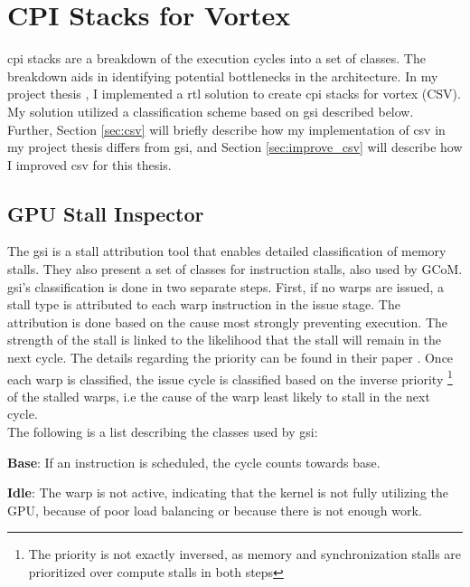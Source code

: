 \chapter{CPI Stacks for Vortex}

\Acrfull{cpi} stacks are a breakdown of the execution cycles into a set of classes. The breakdown aids in identifying potential bottlenecks in the architecture. In my project thesis \cite{Aurud_Project}, I implemented a \acrfull{rtl} solution to create \acrshort{cpi} stacks for \Gls{vortex} (CSV). My solution utilized a classification scheme based on \acrshort{gsi} \cite{GSI_GPU_Stall_Inspector} described below. Further, Section \ref{sec:csv} will briefly describe how my implementation of \acrshort{csv} in my project thesis differs from \acrshort{gsi}, and Section \ref{sec:improve_csv} will describe how I improved \acrshort{csv} for this thesis.

\section{GPU Stall Inspector} \label{sec:gsi}

The \acrfull{gsi}\cite{GSI_GPU_Stall_Inspector} is a stall attribution tool that enables detailed classification of memory stalls. They also present a set of classes for instruction stalls, also used by GCoM\cite{gcom}. \acrshort{gsi}'s classification is done in two separate steps. First, if no warps are issued, a stall type is attributed to each warp instruction in the issue stage. The attribution is done based on the cause most strongly preventing execution. The strength of the stall is linked to the likelihood that the stall will remain in the next cycle. The details regarding the priority can be found in their paper \cite{GSI_GPU_Stall_Inspector}. Once each warp is classified, the issue cycle is classified based on the inverse priority \footnote{The priority is not exactly inversed, as memory and synchronization stalls are prioritized over compute stalls in
both steps} of the stalled warps, i.e the cause of the warp least likely to stall in the next cycle. \\

\noindent
The following is a list describing the classes used by \acrshort{gsi}:

\noindent
\textbf{Base}: If an instruction is scheduled, the cycle counts towards base.

\noindent
\textbf{Idle}: The warp is not active, indicating that the kernel is not fully utilizing the GPU, because of poor load balancing or because there is not enough work.

